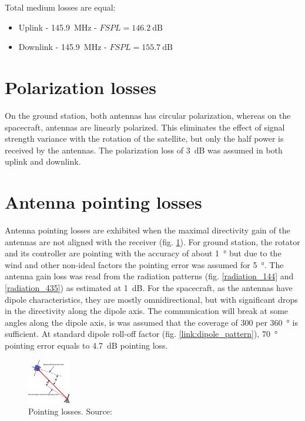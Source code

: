 Total medium losses are equal:
\begin{itemize}
    \item Uplink - \SI{145.9}{\MHz} - $FSPL = \SI{146.2}{\dB}$
    \item Downlink - \SI{145.9}{\MHz} - $FSPL = \SI{155.7}{\dB}$
\end{itemize}


\section{Polarization losses}
On the ground station, both antennas has circular polarization, whereas on the spacecraft, antennas are linearly polarized. This eliminates the effect of signal strength variance with the rotation of the satellite, but only the half power is received by the antennas. The polarization loss of \SI{3}{\dB} was assumed in both uplink and downlink.

\section{Antenna pointing losses}
Antenna pointing losses are exhibited when the maximal directivity gain of the antennas are not aligned with the receiver (fig. \ref{link:pointing_loss}). For ground station, the rotator and its controller are pointing with the accuracy of about \SI{1}{\degree} but due to the wind and other non-ideal factors the pointing error was assumed for \SI{5}{\degree}. The antenna gain loss was read from the radiation patterns (fig. \ref{radiation_144} and \ref{radiation_435}) as estimated at \SI{1}{\dB}. For the spacecraft, as the antennas have dipole characteristics, they are mostly omnidirectional, but with significant drops in the directivity along the dipole axis. The communication will break at some angles along the dipole axis, is was assumed that the coverage of \si{300} per \SI{360}{\degree} is sufficient. At standard dipole roll-off factor (fig. \ref{link:dipole_pattern}), \SI{70}{\degree} pointing error equals to \SI{4.7}{\dB} pointing loss.

\begin{figure}
    \centering
    \includegraphics[width=0.5\paperwidth]{img/8/pointing_loss.pdf}
    \caption{Pointing losses. Source: \cite{amsat_link_budget}}
    \label{link:pointing_loss}
\end{figure}

